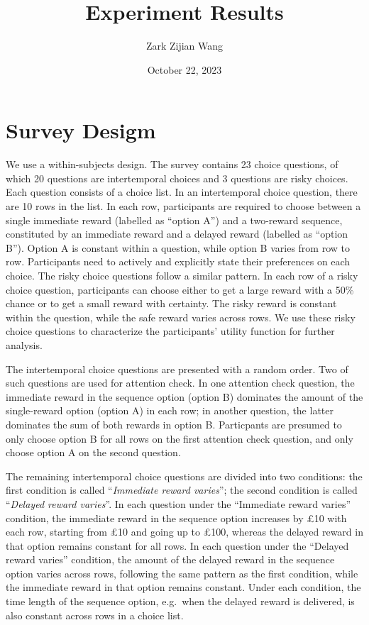\documentclass[
  12pt,
]{article}
\title{Experiment Results}
\author{Zark Zijian Wang}
\date{October 22, 2023}
\begin{document}
\maketitle

\hypertarget{survey-desigm}{%
\section{Survey Desigm}\label{survey-desigm}}

We use a within-subjects design. The survey contains 23 choice
questions, of which 20 questions are intertemporal choices and 3
questions are risky choices. Each question consists of a choice list. In
an intertemporal choice question, there are 10 rows in the list. In each
row, participants are required to choose between a single immediate
reward (labelled as ``option A'') and a two-reward sequence, constituted
by an immediate reward and a delayed reward (labelled as ``option B'').
Option A is constant within a question, while option B varies from row
to row. Participants need to actively and explicitly state their
preferences on each choice. The risky choice questions follow a similar
pattern. In each row of a risky choice question, participants can choose
either to get a large reward with a 50\% chance or to get a small reward
with certainty. The risky reward is constant within the question, while
the safe reward varies across rows. We use these risky choice questions
to characterize the participants' utility function for further analysis.

The intertemporal choice questions are presented with a random order.
Two of such questions are used for attention check. In one attention
check question, the immediate reward in the sequence option (option B)
dominates the amount of the single-reward option (option A) in each row;
in another question, the latter dominates the sum of both rewards in
option B. Particpants are presumed to only choose option B for all rows
on the first attention check question, and only choose option A on the
second question.

The remaining intertemporal choice questions are divided into two
conditions: the first condition is called ``\emph{Immediate reward
varies}''; the second condition is called ``\emph{Delayed reward
varies}''. In each question under the ``Immediate reward varies''
condition, the immediate reward in the sequence option increases by £10
with each row, starting from £10 and going up to £100, whereas the
delayed reward in that option remains constant for all rows. In each
question under the ``Delayed reward varies'' condition, the amount of
the delayed reward in the sequence option varies across rows, following
the same pattern as the first condition, while the immediate reward in
that option remains constant. Under each condition, the time length of
the sequence option, e.g.~when the delayed reward is delivered, is also
constant across rows in a choice list.
\end{document}
